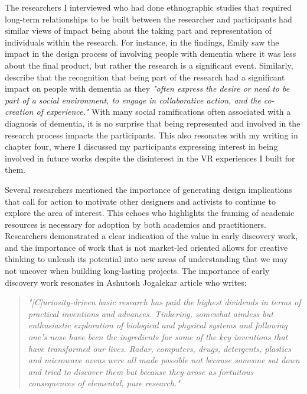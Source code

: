 The researchers I interviewed who had done ethnographic studies that required long-term relationships to be built between the researcher and participants had similar views of impact being about the taking part and representation of individuals within the research. For instance, in the findings, Emily saw the impact in the design process of involving people with dementia where it was less about the final product, but rather the research is a significant event. Similarly, \cite{foley_struggle_2019} describe that the recognition that being part of the research had a significant impact on people with dementia as they \textit{"often express the desire or need to be part of a social environment, to engage in collaborative action, and the co-creation of experience."} With many social ramifications often associated with a diagnosis of dementia, it is no surprise that being represented and involved in the research process impacts the participants. This also resonates with my writing in chapter four, where I discussed my participants expressing interest in being involved in future works despite the disinterest in the VR experiences I built for them.

Several researchers mentioned the importance of generating design implications that call for action to motivate other designers and activists to continue to explore the area of interest. This echoes \cite{colusso2017translational} who highlights the framing of academic resources is necessary for adoption by both academics and practitioners. Researchers demonstrated a clear indication of the value in early discovery work, and the importance of work that is not market-led oriented allows for creative thinking to unleash its potential into new areas of understanding that we may not uncover when building long-lasting projects. The importance of early discovery work resonates in Ashutosh Jogalekar article who writes: 

\begin{quote}
    
\textit{"[C]uriosity-driven basic research has paid the highest dividends in terms
of practical inventions and advances. Tinkering, somewhat aimless but enthusiastic exploration of biological and physical systems and following one's nose have been the ingredients for some of the key inventions that have transformed our lives. Radar, computers, drugs, detergents, plastics and microwave ovens were all made possible not because someone sat down and tried to discover them but because they arose as fortuitous consequences of elemental, pure research."} \citep{jogalekar_2012}
\end{quote}


